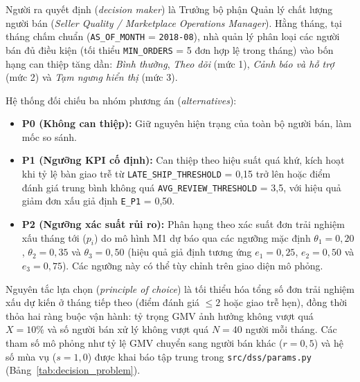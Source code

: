 \documentclass[a4paper]{article}
\begin{document}
Người ra quyết định (\textit{decision maker}) là Trưởng bộ phận Quản lý chất lượng người bán (\textit{Seller Quality / Marketplace Operations Manager}). Hằng tháng, tại tháng chấm chuẩn (\texttt{AS\_OF\_MONTH} = \texttt{2018-08}), nhà quản lý phân loại các người bán đủ điều kiện (tối thiểu \texttt{MIN\_ORDERS} = 5 đơn hợp lệ trong tháng) vào bốn hạng can thiệp tăng dần: \textit{Bình thường}, \textit{Theo dõi} (mức 1), \textit{Cảnh báo và hỗ trợ} (mức 2) và \textit{Tạm ngưng hiển thị} (mức 3).

Hệ thống đối chiếu ba nhóm phương án (\textit{alternatives}):
\begin{itemize}
    \item \textbf{P0 (Không can thiệp):} Giữ nguyên hiện trạng của toàn bộ người bán, làm mốc so sánh.
    \item \textbf{P1 (Ngưỡng KPI cố định):} Can thiệp theo hiệu suất quá khứ, kích hoạt khi tỷ lệ bàn giao trễ từ \texttt{LATE\_\allowbreak{}SHIP\_\allowbreak{}THRESHOLD} = 0,15 trở lên hoặc điểm đánh giá trung bình không quá \texttt{AVG\_\allowbreak{}REVIEW\_\allowbreak{}THRESHOLD} = 3,5, với hiệu quả giảm đơn xấu giả định \texttt{E\_P1} = 0,50.
    \item \textbf{P2 (Ngưỡng xác suất rủi ro):} Phân hạng theo xác suất đơn trải nghiệm xấu tháng tới ($p_i$) do mô hình M1 dự báo qua các ngưỡng mặc định $\theta_1 = 0,20$, $\theta_2 = 0,35$ và $\theta_3 = 0,50$ (hiệu quả giả định tương ứng $e_1 = 0,25$, $e_2 = 0,50$ và $e_3 = 0,75$). Các ngưỡng này có thể tùy chỉnh trên giao diện mô phỏng.
\end{itemize}

Nguyên tắc lựa chọn (\textit{principle of choice}) là tối thiểu hóa tổng số đơn trải nghiệm xấu dự kiến ở tháng tiếp theo (điểm đánh giá $\le 2$ hoặc giao trễ hẹn), đồng thời thỏa hai ràng buộc vận hành: tỷ trọng GMV ảnh hưởng không vượt quá $X = 10\%$ và số người bán xử lý không vượt quá $N = 40$ người mỗi tháng. Các tham số mô phỏng như tỷ lệ GMV chuyển sang người bán khác ($r = 0{,}5$) và hệ số mùa vụ ($s = 1{,}0$) được khai báo tập trung trong \texttt{src/dss/params.py} (Bảng~\ref{tab:decision_problem}).
\end{document}
